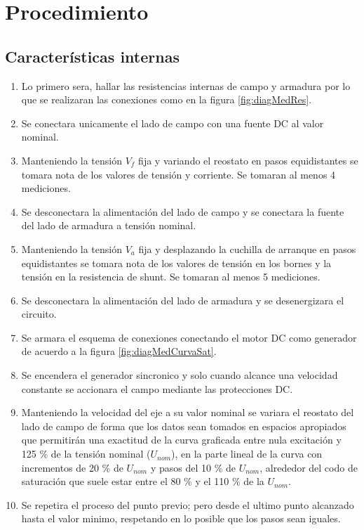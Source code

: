 \documentclass[11pt,letterpaper]{article}     %
\begin{document}
\section{Procedimiento}
\subsection{Características internas}
\begin{enumerate}
    \item Lo primero sera, hallar las resistencias internas de campo y armadura por lo que se realizaran las conexiones como en la figura \ref{fig:diagMedRes}.
    \item Se conectara unicamente el lado de campo con una fuente DC al valor nominal.
    \item Manteniendo la tensión $V_{f}$ fija y variando el reostato en pasos equidistantes se tomara nota de los valores de tensión y corriente. Se tomaran al menos 4 mediciones.
    \item Se desconectara la alimentación del lado de campo y se conectara la fuente del lado de armadura a tensión nominal.
    \item Manteniendo la tensión $V_{a}$ fija y desplazando la cuchilla de arranque en pasos equidistantes se tomara nota de los valores de tensión en los bornes y la tensión en la resistencia de shunt. Se tomaran al menos 5 mediciones.
    \item Se desconectara la alimentación del lado de armadura y se desenergizara el circuito.
    \item Se armara el esquema de conexiones conectando el motor DC como generador de acuerdo a la figura \ref{fig:diagMedCurvaSat}.
    \item Se encendera el generador sincronico y solo cuando alcance una velocidad constante se accionara el campo mediante las protecciones DC.
    \item Manteniendo la velocidad del eje a su valor nominal se variara el reostato del lado de campo de forma que los datos sean tomados en espacios apropiados que permitirán una exactitud de la curva graficada entre nula excitación y 125 \% de la tensión nominal ($U_{nom}$), en la parte lineal de la curva con incrementos de 20 \% de $U_{nom}$ y pasos del 10 \% de $U_{nom}$,
    alrededor del codo de saturación que suele estar entre el 80 \% y el 110 \% de la $U_{nom}$.  
    \item Se repetira el proceso del punto previo; pero desde el ultimo punto alcanzado hasta el valor minimo, respetando en lo posible que los pasos sean iguales.
\end{enumerate}
\end{document}
